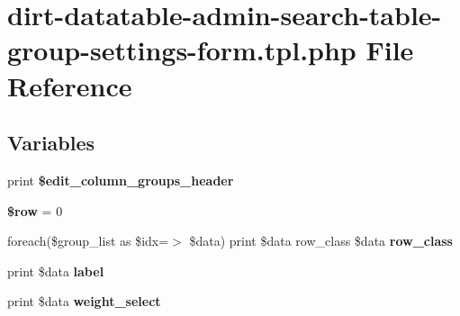 \hypertarget{dirt-datatable-admin-search-table-group-settings-form_8tpl_8php}{}\section{dirt-\/datatable-\/admin-\/search-\/table-\/group-\/settings-\/form.tpl.\+php File Reference}
\label{dirt-datatable-admin-search-table-group-settings-form_8tpl_8php}
\subsection*{Variables}
\begin{DoxyCompactItemize}
\item 
\mbox{\label{dirt-datatable-admin-search-table-group-settings-form_8tpl_8php_ae5fae780d45f223f2020dde2f4f908d7}} 
print {\bfseries \$edit\+\_\+column\+\_\+groups\+\_\+header}
\item 
\mbox{\label{dirt-datatable-admin-search-table-group-settings-form_8tpl_8php_aa1d731aa570613e5bcff831bb10e9b87}} 
{\bfseries \$row} = 0
\item 
\mbox{\label{dirt-datatable-admin-search-table-group-settings-form_8tpl_8php_a20834a2722e9090e9b2b2bd125c437c5}} 
foreach(\$group\+\_\+list as \$idx=$>$ \$data) print \$data row\+\_\+class \$data {\bfseries row\+\_\+class}
\item 
\mbox{\label{dirt-datatable-admin-search-table-group-settings-form_8tpl_8php_ad56bbd35b0b19a6913ef4b3d7a8a6a36}} 
print \$data {\bfseries label}
\item 
\mbox{\label{dirt-datatable-admin-search-table-group-settings-form_8tpl_8php_a1317c2a993afcc9094c904696bf545a3}} 
print \$data {\bfseries weight\+\_\+select}
\item 
\mbox{\label{dirt-datatable-admin-search-table-group-settings-form_8tpl_8php_aa3070057d05f5b222229e92bd1fa2482}} 

\end{DoxyCompactItemize}

